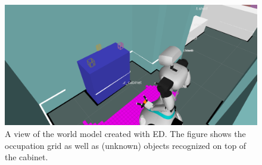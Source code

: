 \begin{figure}[h]
\centering
	\includegraphics[width = 0.8\linewidth]{Figures/ed_segmentation}
	\caption{A view of the world model created with ED. The figure shows the occupation grid as well as (unknown) objects recognized on top of the cabinet.}
	\label{fig:ed_segmentation}
\end{figure}

